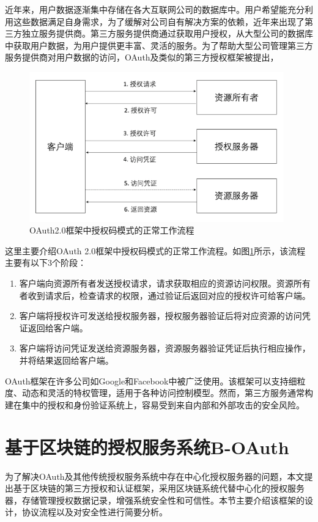 近年来，用户数据逐渐集中存储在各大互联网公司的数据库中。用户希望能充分利用这些数据满足自身需求，为了缓解对公司自有解决方案的依赖，近年来出现了第三方独立服务提供商。第三方服务提供商通过获取用户授权，从大型公司的数据库中获取用户数据，为用户提供更丰富、灵活的服务。为了帮助大型公司管理第三方服务提供商对用户数据的访问，OAuth及类似的第三方授权框架被提出，

\begin{figure}
\centering  
\includegraphics [width=11cm]{figures/oauth.png}
\caption{OAuth2.0框架中授权码模式的正常工作流程}
\label{fig:oauth}
\end{figure}

这里主要介绍OAuth 2.0框架中授权码模式的正常工作流程。如图\ref{fig:oauth}所示，该流程主要有以下3个阶段：

\begin{enumerate}
  \item 客户端向资源所有者发送授权请求，请求获取相应的资源访问权限。资源所有者收到请求后，检查请求的权限，通过验证后返回对应的授权许可给客户端。
  \item 客户端将授权许可发送给授权服务器，授权服务器验证后将对应资源的访问凭证返回给客户端。
  \item 客户端将访问凭证发送给资源服务器，资源服务器验证凭证后执行相应操作，并将结果返回给客户端。
\end{enumerate}

OAuth框架在许多公司如Google和Facebook中被广泛使用。该框架可以支持细粒度、动态和灵活的特权管理，适用于各种访问控制模型。然而，第三方服务通常构建在集中的授权和身份验证系统上，容易受到来自内部和外部攻击的安全风险。

\section{基于区块链的授权服务系统B-OAuth}

为了解决OAuth及其他传统授权服务系统中存在中心化授权服务器的问题，本文提出基于区块链的第三方授权和认证框架，采用区块链系统代替中心化的授权服务器，存储管理授权数据记录，增强系统安全性和可信性。本节主要介绍该框架的设计，协议流程以及对安全性进行简要分析。

